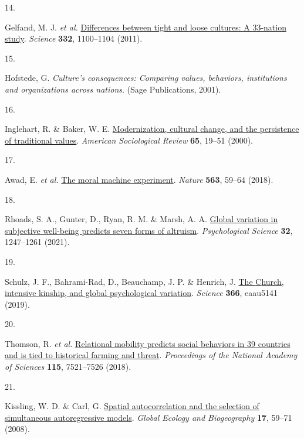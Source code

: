 \documentclass[
  man,floatsintext]{apa6}
\newlength{\cslhangindent}
\newlength{\csllabelwidth}
\newlength{\cslentryspacingunit} %
\newenvironment{CSLReferences}[2] %
 {%
  \setlength{\parindent}{0pt}
  \ifodd #1
  \let\oldpar\par
  \def\par{\hangindent=\cslhangindent\oldpar}
  \fi
  \setlength{\parskip}{#2\cslentryspacingunit}
 }%
 {}
\newcommand{\CSLLeftMargin}[1]{\parbox[t]{\csllabelwidth}{#1}}
\newcommand{\CSLRightInline}[1]{\parbox[t]{\linewidth - \csllabelwidth}{#1}\break}
\begin{document}
\begin{CSLReferences}{0}{0}
\leavevmode{}%
\CSLLeftMargin{14. }%
\CSLRightInline{Gelfand, M. J. \emph{et al.} \href{https://doi.org/10.1126/science.1197754}{Differences between tight and loose cultures: A 33-nation study}. \emph{Science} \textbf{332}, 1100--1104 (2011).}

\leavevmode{}%
\CSLLeftMargin{15. }%
\CSLRightInline{Hofstede, G. \emph{Culture's consequences: Comparing values, behaviors, institutions and organizations across nations}. (Sage Publications, 2001).}

\leavevmode{}%
\CSLLeftMargin{16. }%
\CSLRightInline{Inglehart, R. \& Baker, W. E. \href{https://doi.org/10.2307/2657288}{Modernization, cultural change, and the persistence of traditional values}. \emph{American Sociological Review} \textbf{65}, 19--51 (2000).}

\leavevmode{}%
\CSLLeftMargin{17. }%
\CSLRightInline{Awad, E. \emph{et al.} \href{https://doi.org/10.1038/s41586-018-0637-6}{The moral machine experiment}. \emph{Nature} \textbf{563}, 59--64 (2018).}

\leavevmode{}%
\CSLLeftMargin{18. }%
\CSLRightInline{Rhoads, S. A., Gunter, D., Ryan, R. M. \& Marsh, A. A. \href{https://doi.org/10.1177/0956797621994767}{Global variation in subjective well-being predicts seven forms of altruism}. \emph{Psychological Science} \textbf{32}, 1247--1261 (2021).}

\leavevmode{}%
\CSLLeftMargin{19. }%
\CSLRightInline{Schulz, J. F., Bahrami-Rad, D., Beauchamp, J. P. \& Henrich, J. \href{https://doi.org/10.1126/science.aau5141}{The {C}hurch, intensive kinship, and global psychological variation}. \emph{Science} \textbf{366}, eaau5141 (2019).}

\leavevmode{}%
\CSLLeftMargin{20. }%
\CSLRightInline{Thomson, R. \emph{et al.} \href{https://doi.org/10.1073/pnas.1713191115}{Relational mobility predicts social behaviors in 39 countries and is tied to historical farming and threat}. \emph{Proceedings of the National Academy of Sciences} \textbf{115}, 7521--7526 (2018).}

\leavevmode{}%
\CSLLeftMargin{21. }%
\CSLRightInline{Kissling, W. D. \& Carl, G. \href{https://doi.org/10.1111/j.1466-8238.2007.00334.x}{Spatial autocorrelation and the selection of simultaneous autoregressive models}. \emph{Global Ecology and Biogeography} \textbf{17}, 59--71 (2008).}


\end{CSLReferences}
\end{document}
